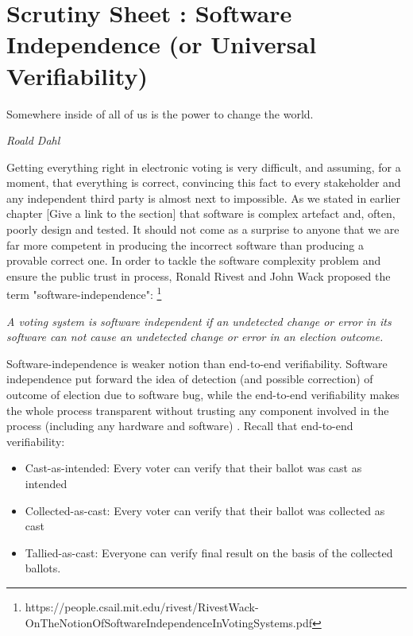 \chapter{Scrutiny Sheet : Software Independence (or Universal Verifiability)}
\label{cha:software_independence}

\epigraph{Somewhere inside of all of us is the power to change the world.} 
{\textit{Roald Dahl }}

Getting everything right in electronic voting is very difficult, and assuming, for a moment,
that everything is correct, convincing this fact to every stakeholder and  any independent third party 
is almost next to impossible.  As we stated in earlier chapter [Give a link to the section] that 
software is complex artefact and, often, poorly design and tested. It should not come as a surprise to anyone
that we are far more competent in producing the incorrect software than producing a provable correct one. 
 In order to tackle the software complexity problem and ensure the 
public trust in process, Ronald Rivest and John Wack  proposed  the term "software-independence": 
\footnote{https://people.csail.mit.edu/rivest/RivestWack-OnTheNotionOfSoftwareIndependenceInVotingSystems.pdf}

\textit{A voting system is software independent if an undetected change or error
   in its software can not cause an undetected change or error in an 
   election outcome.}
 
 
 Software-independence is weaker notion than  end-to-end verifiability. Software independence 
 put forward the idea of detection (and possible correction) of outcome of election due to 
 software bug, while the end-to-end verifiability makes the whole process transparent without trusting 
 any component involved in the process (including any hardware and software) \citep{Bernhard:2017:PES}.
 Recall that end-to-end verifiability:
  \begin{itemize}
  \item Cast-as-intended: Every voter can verify that their ballot was cast as
  intended
  \item Collected-as-cast: Every voter can verify that their ballot was collected as
  cast
  \item Tallied-as-cast: Everyone can verify final result on the basis of the
  collected ballots.
\end{itemize}


